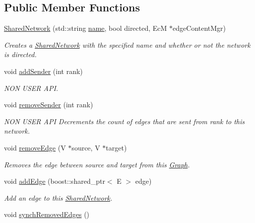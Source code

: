\subsection*{Public Member Functions}
\begin{DoxyCompactItemize}
\item 
\hyperlink{classrepast_1_1_shared_network_a70d7821c1371664ecbac90a077ce61d7}{Shared\-Network} (std\-::string \hyperlink{classrepast_1_1_projection_ab60a0ab4f584685780307d7431b61800}{name}, bool directed, Ec\-M $\ast$edge\-Content\-Mgr)
\begin{DoxyCompactList}\small\item\em Creates a \hyperlink{classrepast_1_1_shared_network}{Shared\-Network} with the specified name and whether or not the network is directed. \end{DoxyCompactList}\item 
void \hyperlink{classrepast_1_1_shared_network_a877cec9bc39c22449a38acf018a93986}{add\-Sender} (int rank)
\begin{DoxyCompactList}\small\item\em N\-O\-N U\-S\-E\-R A\-P\-I. \end{DoxyCompactList}\item 
\hypertarget{classrepast_1_1_shared_network_a4551cfa219810bf1fad86c8bf7203aee}{void \hyperlink{classrepast_1_1_shared_network_a4551cfa219810bf1fad86c8bf7203aee}{remove\-Sender} (int rank)}\label{classrepast_1_1_shared_network_a4551cfa219810bf1fad86c8bf7203aee}

\begin{DoxyCompactList}\small\item\em N\-O\-N U\-S\-E\-R A\-P\-I Decrements the count of edges that are sent from rank to this network. \end{DoxyCompactList}\item 
void \hyperlink{classrepast_1_1_shared_network_a93396d324b570d7728cbe6ce3271173c}{remove\-Edge} (V $\ast$source, V $\ast$target)
\begin{DoxyCompactList}\small\item\em Removes the edge between source and target from this \hyperlink{classrepast_1_1_graph}{Graph}. \end{DoxyCompactList}\item 
void \hyperlink{classrepast_1_1_shared_network_aef2348197f25207e12f128f1eea01b8a}{add\-Edge} (boost\-::shared\-\_\-ptr$<$ E $>$ edge)
\begin{DoxyCompactList}\small\item\em Add an edge to this \hyperlink{classrepast_1_1_shared_network}{Shared\-Network}. \end{DoxyCompactList}\item 
\hypertarget{classrepast_1_1_shared_network_acaa004bf43b32a5d864abd93cd3dd409}{void \hyperlink{classrepast_1_1_shared_network_acaa004bf43b32a5d864abd93cd3dd409}{synch\-Removed\-Edges} ()}\label{classrepast_1_1_shared_network_acaa004bf43b32a5d864abd93cd3dd409}


\end{DoxyCompactItemize}
